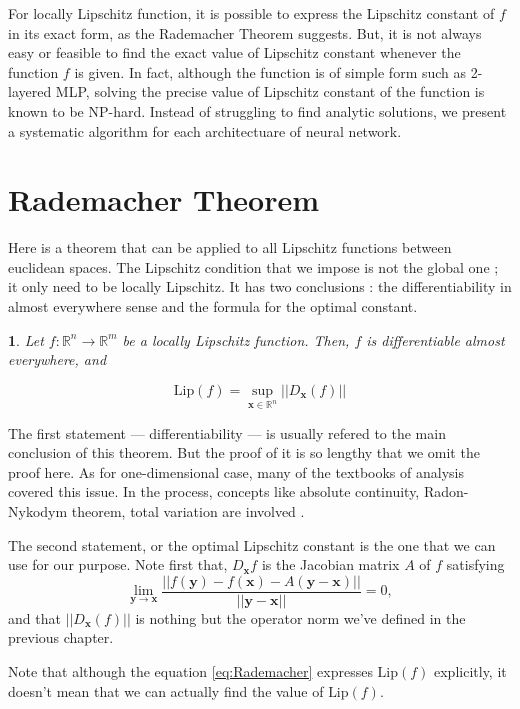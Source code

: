 \documentclass[12pt]{report}
\numberwithin{figure}{chapter}
\theoremstyle{plain}
\newtheorem{theorem}{\protect\theoremname}[chapter]
\theoremstyle{definition}
\theoremstyle{corollary}
\theoremstyle{definition}
\theoremstyle{plain}
\theoremstyle{definition}
\theoremstyle{plain}
\providecommand{\theoremname}{Theorem}
\newcommand\bx{\ensuremath{\boldsymbol x}}
\newcommand\by{\ensuremath{\boldsymbol y}}
\newcommand\lip{\ensuremath{\text{Lip}}}
\begin{document}
For locally Lipschitz function, it is possible to express the Lipschitz constant of \(f\) in its exact form, as the Rademacher Theorem suggests.
But, it is not always easy or feasible to find the exact value of Lipschitz constant whenever the function \(f\) is given.
In fact, although the function is of simple form such as 2-layered MLP, solving the precise value of Lipschitz constant of the function is known to be NP-hard.
Instead of struggling to find analytic solutions, we present a systematic algorithm for each architectuare of neural network\cite{VA-SK}.

\section{Rademacher Theorem}
Here is a theorem that can be applied to all Lipschitz functions between euclidean spaces.
The Lipschitz condition that we impose is not the global one ; it only need to be locally Lipschitz.
It has two conclusions : the differentiability in almost everywhere sense and the formula for the optimal constant.

\begin{theorem}\label{theo:Rademacher}
\cite{HF}
Let \(f:\mathbb R^n\to\mathbb R^m\) be a locally Lipschitz function.
Then,
\(f\) is differentiable almost everywhere, and
\end{theorem}
\begin{equation}\label{eq:Rademacher}
\lip(f) = \sup_{\bx\in\mathbb R^n}||D_{\bx}(f)||
\end{equation}

The first statement --- differentiability --- is usually refered to the main conclusion of this theorem.
But the proof of it is so lengthy that we omit the proof here.
As for one-dimensional case, many of the textbooks of analysis covered this issue.
In the process, concepts like absolute continuity, Radon-Nykodym theorem, total variation are involved \cite{WR}.

The second statement, or the optimal Lipschitz constant is the one that we can use for our purpose.
Note first that, \(D_{\bx}f\) is the Jacobian matrix \(A\) of \(f\) satisfying
\[\lim_{\by\to\bx}\frac{||f(\by)-f(\bx)-A(\by-\bx)||}{||\by-\bx||}=0,\]
and that \(||D_{\bx}(f)||\) is nothing but the operator norm we've defined in the previous chapter.

Note that although the equation \eqref{eq:Rademacher} expresses \(\lip(f)\) explicitly, it doesn't mean that we can actually find the value of \(\lip(f)\).
\end{document}
